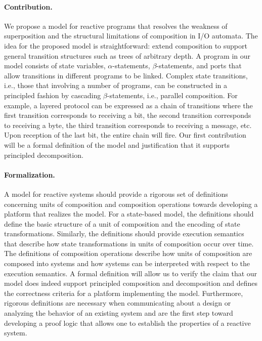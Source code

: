 \paragraph{Contribution.}
We propose a model for reactive programs that resolves the weakness of superposition and the structural limitations of composition in I/O automata.
The idea for the proposed model is straightforward:  extend composition to support general transition structures such as trees of arbitrary depth.
A program in our model consists of state variables, $\alpha$-statements, $\beta$-statements, and ports that allow transitions in different programs to be linked.
Complex state transitions, i.e., those that involving a number of programs, can be constructed in a principled fashion by cascading $\beta$-statements, i.e., parallel composition.
For example, a layered protocol can be expressed as a chain of transitions where the first transition corresponds to receiving a bit, the second transition corresponds to receiving a byte, the third transition corresponds to receiving a message, etc.
Upon reception of the last bit, the entire chain will fire.
Our first contribution will be a formal definition of the model and justification that it supports principled decomposition.


\paragraph{Formalization.}
A model for reactive systems should provide a rigorous set of definitions concerning units of composition and composition operations towards developing a platform that realizes the model.
For a state-based model, the definitions should define the basic structure of a unit of composition and the encoding of state transformations.
Similarly, the definitions should provide execution semantics that describe how state transformations in units of composition occur over time.
The definitions of composition operations describe how units of composition are composed into systems and how systems can be interpreted with respect to the execution semantics.
A formal definition will allow us to verify the claim that our model does indeed support principled composition and decomposition and defines the correctness criteria for a platform implementing the model.
Furthermore, rigorous definitions are necessary when communicating about a design or analyzing the behavior of an existing system and are the first step toward developing a proof logic that allows one to establish the properties of a reactive system.

